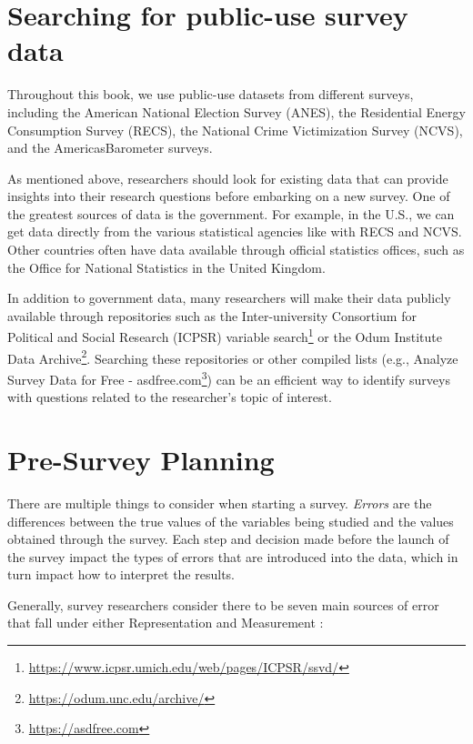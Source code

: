 \documentclass[
]{krantz}
\renewcommand{\href}[2]{#2\footnote{\url{#1}}}
\begin{document}
\hypertarget{searching-for-public-use-survey-data}{%
\section{Searching for public-use survey data}\label{searching-for-public-use-survey-data}}

Throughout this book, we use public-use datasets from different surveys, including the American National Election Survey (ANES), the Residential Energy Consumption Survey (RECS), the National Crime Victimization Survey (NCVS), and the AmericasBarometer surveys.

As mentioned above, researchers should look for existing data that can provide insights into their research questions before embarking on a new survey. One of the greatest sources of data is the government. For example, in the U.S., we can get data directly from the various statistical agencies like with RECS and NCVS. Other countries often have data available through official statistics offices, such as the Office for National Statistics in the United Kingdom.

In addition to government data, many researchers will make their data publicly available through repositories such as the \href{https://www.icpsr.umich.edu/web/pages/ICPSR/ssvd/}{Inter-university Consortium for Political and Social Research (ICPSR) variable search} or the \href{https://odum.unc.edu/archive/}{Odum Institute Data Archive}. Searching these repositories or other compiled lists (e.g., \href{https://asdfree.com}{Analyze Survey Data for Free - asdfree.com}) can be an efficient way to identify surveys with questions related to the researcher's topic of interest.

\hypertarget{pre-survey-planning}{%
\section{Pre-Survey Planning}\label{pre-survey-planning}}

There are multiple things to consider when starting a survey. \emph{Errors} are the differences between the true values of the variables being studied and the values obtained through the survey. Each step and decision made before the launch of the survey impact the types of errors that are introduced into the data, which in turn impact how to interpret the results.

Generally, survey researchers consider there to be seven main sources of error that fall under either Representation and Measurement \citep{groves2009survey}:
\end{document}
